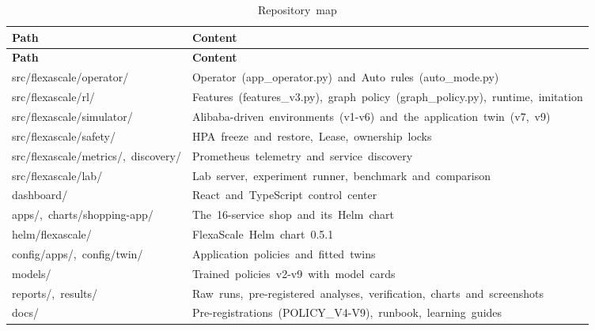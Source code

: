 \documentclass[12pt,a4paper,oneside]{report}
\begin{document}
\begingroup\small\setlength{\tabcolsep}{4pt}\renewcommand{\arraystretch}{1.25}
\begin{longtable}{|>{\raggedright\arraybackslash}p{5.20cm}|>{\raggedright\arraybackslash}p{9.66cm}|}
\caption{Repository~map}\label{tab:repo}\\\hline
\textbf{Path} & \textbf{Content}\\\hline\endfirsthead
\hline \textbf{Path} & \textbf{Content}\\\hline\endhead
src/flexascale/operator/ & Operator~(app\_operator.py)~and~Auto~rules~(auto\_mode.py)\\\hline
src/flexascale/rl/ & Features~(features\_v3.py),~graph~policy~(graph\_policy.py),~runtime,~imitation\\\hline
src/flexascale/simulator/ & Alibaba-driven~environments~(v1-v6)~and~the~application~twin~(v7,~v9)\\\hline
src/flexascale/safety/ & HPA~freeze~and~restore,~Lease,~ownership~locks\\\hline
src/flexascale/metrics/,~discovery/ & Prometheus~telemetry~and~service~discovery\\\hline
src/flexascale/lab/ & Lab~server,~experiment~runner,~benchmark~and~comparison\\\hline
dashboard/ & React~and~TypeScript~control~center\\\hline
apps/,~charts/shopping-app/ & The~16-service~shop~and~its~Helm~chart\\\hline
helm/flexascale/ & FlexaScale~Helm~chart~0.5.1\\\hline
config/apps/,~config/twin/ & Application~policies~and~fitted~twins\\\hline
models/ & Trained~policies~v2-v9~with~model~cards\\\hline
reports/,~results/ & Raw~runs,~pre-registered~analyses,~verification,~charts~and~screenshots\\\hline
docs/ & Pre-registrations~(POLICY\_V4-V9),~runbook,~learning~guides\\\hline
\end{longtable}\endgroup
\end{document}
